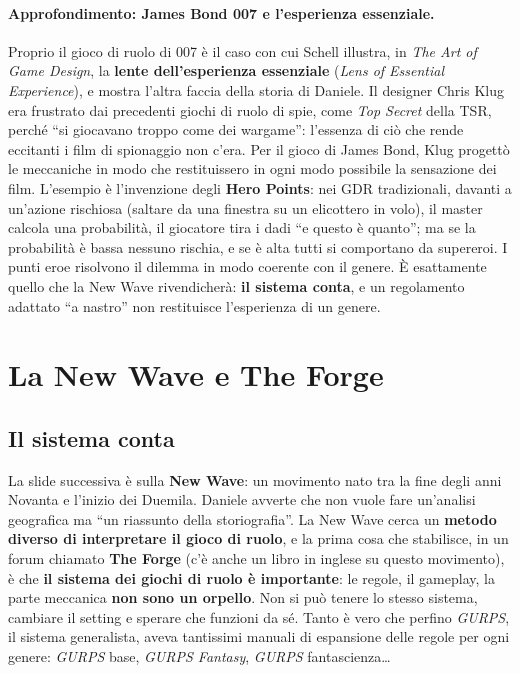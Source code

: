 \paragraph{Approfondimento: James Bond 007 e l'esperienza essenziale.} Proprio
il gioco di ruolo di 007 è il caso con cui Schell illustra, in \emph{The Art of
Game Design}, la \textbf{lente dell'esperienza essenziale} (\emph{Lens of
Essential Experience}), e mostra l'altra faccia della storia di Daniele. Il
designer Chris Klug era frustrato dai precedenti giochi di ruolo di spie, come
\emph{Top Secret} della TSR, perché ``si giocavano troppo come dei wargame'':
l'essenza di ciò che rende eccitanti i film di spionaggio non c'era. Per il
gioco di James Bond, Klug progettò le meccaniche in modo che restituissero in
ogni modo possibile la sensazione dei film. L'esempio è l'invenzione degli
\textbf{Hero Points}: nei GDR tradizionali, davanti a un'azione rischiosa (saltare
da una finestra su un elicottero in volo), il master calcola una probabilità, il
giocatore tira i dadi ``e questo è quanto''; ma se la probabilità è bassa
nessuno rischia, e se è alta tutti si comportano da supereroi. I punti eroe
risolvono il dilemma in modo coerente con il genere. È esattamente quello che
la New Wave rivendicherà: \textbf{il sistema conta}, e un regolamento adattato ``a
nastro'' non restituisce l'esperienza di un genere.

\section{La New Wave e The Forge}
\label{a2:sec:gdr-newwave}

\subsection{Il sistema conta}

La slide successiva è sulla \textbf{New Wave}: un movimento nato tra la fine
degli anni Novanta e l'inizio dei Duemila. Daniele avverte che non vuole fare
un'analisi geografica ma ``un riassunto della storiografia''. La New Wave cerca
un \textbf{metodo diverso di interpretare il gioco di ruolo}, e la prima cosa
che stabilisce, in un forum chiamato \textbf{The Forge} (c'è anche un libro in
inglese su questo movimento), è che \textbf{il sistema dei giochi di ruolo è
importante}: le regole, il gameplay, la parte meccanica \textbf{non sono un
orpello}. Non si può tenere lo stesso sistema, cambiare il setting e sperare che
funzioni da sé. Tanto è vero che perfino \emph{GURPS}, il sistema generalista,
aveva tantissimi manuali di espansione delle regole per ogni genere:
\emph{GURPS} base, \emph{GURPS Fantasy}, \emph{GURPS} fantascienza\ldots


